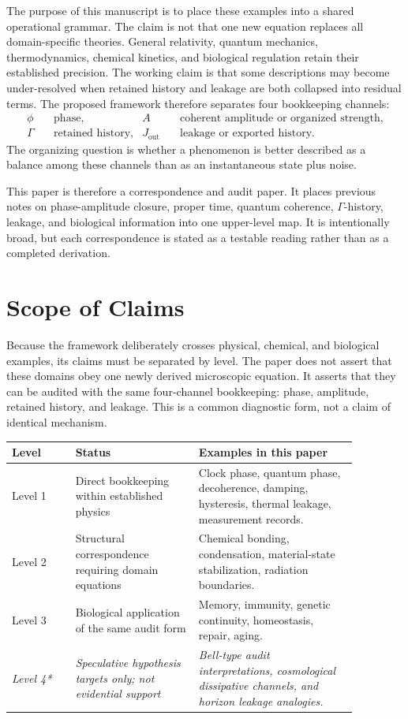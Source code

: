 \documentclass[11pt,a4paper]{article}
\newcommand{\Ghist}{\Gamma}
\newcommand{\Jout}{J_{\mathrm{out}}}
\begin{document}
The purpose of this manuscript is to place these examples into a shared operational grammar.  The claim is not that one new equation replaces all domain-specific theories.  General relativity, quantum mechanics, thermodynamics, chemical kinetics, and biological regulation retain their established precision.  The working claim is that some descriptions may become under-resolved when retained history and leakage are both collapsed into residual terms.  The proposed framework therefore separates four bookkeeping channels:
\begin{align}
  \phi &\quad \text{phase},
  & A &\quad \text{coherent amplitude or organized strength},\nonumber\\
  \Ghist &\quad \text{retained history},
  & \Jout &\quad \text{leakage or exported history}.
  \label{eq:core-channels}
\end{align}
The organizing question is whether a phenomenon is better described as a balance among these channels than as an instantaneous state plus noise.

This paper is therefore a correspondence and audit paper.  It places previous notes on phase-amplitude closure, proper time, quantum coherence, \(\Ghist\)-history, leakage, and biological information into one upper-level map.  It is intentionally broad, but each correspondence is stated as a testable reading rather than as a completed derivation.

\section{Scope of Claims}
Because the framework deliberately crosses physical, chemical, and biological examples, its claims must be separated by level.  The paper does not assert that these domains obey one newly derived microscopic equation.  It asserts that they can be audited with the same four-channel bookkeeping: phase, amplitude, retained history, and leakage.  This is a common diagnostic form, not a claim of identical mechanism.

\begin{center}
\small
\begin{tabular}{L{0.16\linewidth}L{0.31\linewidth}L{0.40\linewidth}}
\toprule
Level & Status & Examples in this paper \\
\midrule
Level 1 & Direct bookkeeping within established physics & Clock phase, quantum phase, decoherence, damping, hysteresis, thermal leakage, measurement records. \\
Level 2 & Structural correspondence requiring domain equations & Chemical bonding, condensation, material-state stabilization, radiation boundaries. \\
Level 3 & Biological application of the same audit form & Memory, immunity, genetic continuity, homeostasis, repair, aging. \\
\emph{Level 4*} & \emph{Speculative hypothesis targets only; not evidential support} & \emph{Bell-type audit interpretations, cosmological dissipative channels, and horizon leakage analogies.} \\
\bottomrule
\end{tabular}
\end{center}
\end{document}
